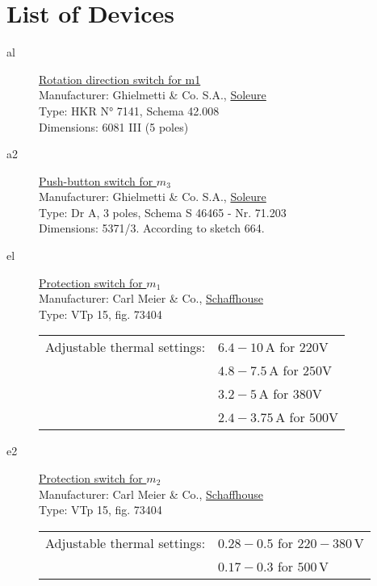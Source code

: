 \chapter{List of Devices}

\begin{description}
    \item[al] \underline{Rotation direction switch for m1} \\
    Manufacturer: Ghielmetti \& Co. S.A., \underline{Soleure} \\
    Type: HKR N° 7141, Schema 42.008 \\
    Dimensions: 6081 III (5 poles)

    \item[a2] \underline{Push-button switch for $m_3$} \\
    Manufacturer: Ghielmetti \& Co. S.A., \underline{Soleure} \\
    Type: Dr A, 3 poles, Schema S 46465 - Nr. 71.203 \\
    Dimensions: 5371/3. According to sketch 664.

    \item[el] \underline{Protection switch for $m_1$} \\
    Manufacturer: Carl Meier \& Co., \underline{Schaffhouse} \\
    Type: VTp 15, fig. 73404 \\
    \begin{tabular}{@{}ll}
        Adjustable thermal settings: & $6.4 - 10\,\mathrm{A}$ for $220\mathrm{V}$   \\
        & $4.8 - 7.5\,\mathrm{A}$ for $250\mathrm{V}$  \\
        & $3.2 - 5\,\mathrm{A}$ for $380\mathrm{V}$    \\
        & $2.4 - 3.75\,\mathrm{A}$ for $500\mathrm{V}$
    \end{tabular}

    \item[e2] \underline{Protection switch for $m_2$} \\
    Manufacturer: Carl Meier \& Co., \underline{Schaffhouse} \\
    Type: VTp 15, fig. 73404 \\
    \begin{tabular}{@{}ll}
        Adjustable thermal settings: & $0.28 - 0.5$ for $220 - 380\,\mathrm{V}$ \\
        & $0.17 - 0.3$ for $500\,\mathrm{V}$       \\
    \end{tabular}


\end{description}
